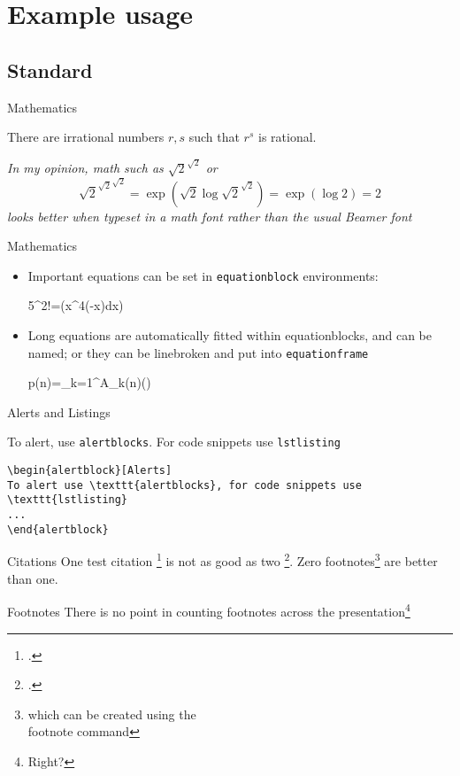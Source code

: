 \documentclass[12pt]{beamer}
\begin{document}
\section{Example usage}
\subsection{Standard}
\begin{frame}{Mathematics}
\begin{theorem}
There are irrational numbers $r,s$ such that $r^s$ is rational.
\end{theorem}
\textit{In my opinion, math such as $\sqrt{2}^{\sqrt{2}}$ or 
 $$
 {\sqrt{2}^{\sqrt{2}}}^{\sqrt{2}}=\exp(\sqrt{2}\log\sqrt{2}^{\sqrt{2}})=\exp(\log{2})=2
 $$ looks better when typeset in a math font rather than the usual Beamer font}\hfill\qedsymbol

\end{frame}
\begin{frame}{Mathematics}
\begin{itemize}
	\item Important equations can be set in \texttt{equationblock} environments:
	\begin{equationblock}
		5^2!=\exp\left(\int x^4\exp(-x)\;dx\right)
	\end{equationblock}	
	\item Long equations are automatically fitted within equationblocks, and can be named; or they can be linebroken and put into \texttt{equationframe}
	\begin{equationblock}
		p(n)=\sum_{k=1}^{\infty}A_{k}(n)\left(\sinh{}\right)
	\end{equationblock}
\end{itemize}
\end{frame}
\begin{frame}[fragile]{Alerts and Listings}
\begin{alertblock}
To alert, use \texttt{alertblocks}. For code snippets use \texttt{lstlisting}
\begin{lstlisting}
\begin{alertblock}[Alerts]
To alert use \texttt{alertblocks}, for code snippets use \texttt{lstlisting}
...
\end{alertblock}
\end{lstlisting}
\end{alertblock}
\end{frame}
\begin{frame}{Citations}
One test citation \footcite{AdamsFournier2003} is not as good as two \footcite{AlexanderianPetraStadlerEtAl2016}. 
Zero footnotes\footnote{which can be created using the \\footnote command} are better than one.
\end{frame}
\begin{frame}{Footnotes}
	There is no point in counting footnotes across the presentation\footnote{Right?}
\end{frame}
	
\end{document}
